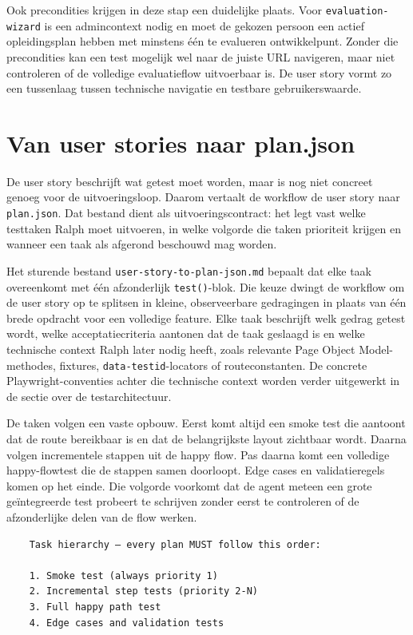 Ook precondities krijgen in deze stap een duidelijke plaats. Voor \texttt{evaluation-wizard} is een admincontext nodig en moet de gekozen persoon een actief opleidingsplan hebben met minstens één te evalueren ontwikkelpunt. Zonder die precondities kan een test mogelijk wel naar de juiste URL navigeren, maar niet controleren of de volledige evaluatieflow uitvoerbaar is. De user story vormt zo een tussenlaag tussen technische navigatie en testbare gebruikerswaarde.

\section{Van user stories naar plan.json}

De user story beschrijft wat getest moet worden, maar is nog niet concreet genoeg voor de uitvoeringsloop. Daarom vertaalt de workflow de user story naar \texttt{plan.json}. Dat bestand dient als uitvoeringscontract: het legt vast welke testtaken Ralph moet uitvoeren, in welke volgorde die taken prioriteit krijgen en wanneer een taak als afgerond beschouwd mag worden.

Het sturende bestand \texttt{user-story-to-plan-json.md} bepaalt dat elke taak overeenkomt met één afzonderlijk \texttt{test()}-blok. Die keuze dwingt de workflow om de user story op te splitsen in kleine, observeerbare gedragingen in plaats van één brede opdracht voor een volledige feature. Elke taak beschrijft welk gedrag getest wordt, welke acceptatiecriteria aantonen dat de taak geslaagd is en welke technische context Ralph later nodig heeft, zoals relevante Page Object Model-methodes, fixtures, \texttt{data-testid}-locators of routeconstanten. De concrete Playwright-conventies achter die technische context worden verder uitgewerkt in de sectie over de testarchitectuur.

De taken volgen een vaste opbouw. Eerst komt altijd een smoke test die aantoont dat de route bereikbaar is en dat de belangrijkste layout zichtbaar wordt. Daarna volgen incrementele stappen uit de happy flow. Pas daarna komt een volledige happy-flowtest die de stappen samen doorloopt. Edge cases en validatieregels komen op het einde. Die volgorde voorkomt dat de agent meteen een grote geïntegreerde test probeert te schrijven zonder eerst te controleren of de afzonderlijke delen van de flow werken.

\begin{verbatim}
    Task hierarchy — every plan MUST follow this order:
    
    1. Smoke test (always priority 1)
    2. Incremental step tests (priority 2-N)
    3. Full happy path test
    4. Edge cases and validation tests
\end{verbatim}

